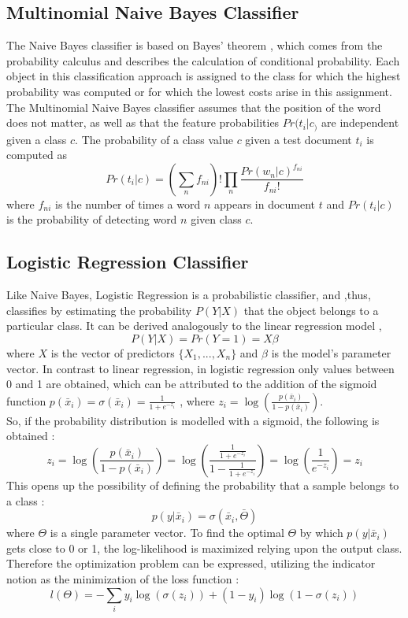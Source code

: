 \documentclass[a4paper, 11pt,titlepage,oneside,openany]{book}
\begin{document}
\subsection{Multinomial Naive Bayes Classifier}
The Naive Bayes classifier is based on  Bayes' theorem \cite{btheory}, which comes from the probability calculus and describes the calculation of conditional probability. Each object in this classification approach is assigned to the class for which the highest probability was computed or for which the lowest costs arise in this assignment.  \\
\noindent The Multinomial Naive Bayes classifier assumes that the position of the word does not matter, as well as  that the feature probabilities $Pr(t_i|c_)$ are independent given a class $c$.
The probability of a class value $c$ given a test document $t_i$ is computed as \cite{multinomialnb}
\[
Pr(t_i|c)=(\sum_{n}f_{ni})!\prod_{n}\frac{Pr(w_n|c)^{f_{ni}}}{f_{ni}!}
\]
where $f_{ni}$ is the number of times a word $n$ appears in document $t$ and $Pr(t_i|c)$ is the probability of detecting word $n$ given class $c$.
\newpage
\subsection{Logistic Regression Classifier}
\noindent Like Naive Bayes, Logistic Regression is a probabilistic classifier, and ,thus, classifies by estimating the probability $P(Y|X)$ that the object belongs to a particular class.
It can be derived analogously to the linear regression model \cite{logisticregressionbook}, 
\[
P(Y|X)=Pr(Y=1)=X\beta
\]
where $X$ is the vector of predictors $\{X_1,...,X_n\}$ and $\beta$ is the model's parameter vector. In contrast to linear regression, in logistic regression only values between 0 and 1 are obtained, which can be attributed to the addition of the sigmoid function $p(\bar{x}_i)=\sigma(\bar{x}_i)=\frac{1}{1+e^{-z_i}}$ \cite{algorithms2}, where $z_i=\log(\frac{p(\bar{x}_i)}{1-p(\bar{x}_i)})$. \\
So, if the probability distribution is modelled with a sigmoid, the following is obtained \cite{algorithms2}:
\[
z_i=\log(\frac{p(\bar{x}_i)}{1-p(\bar{x}_i)})=\log(\frac{\frac{1}{1+e^{-z_i}}}{1-\frac{1}{1+e^{-z_i}}})=\log(\frac{1}{e^{-z_i}})=z_i
\]
This opens up the possibility of defining the probability that a sample belongs to a class \cite{algorithms2}:
\[
p(y|\bar{x}_i)=\sigma(\bar{x}_i,\bar{\Theta})
\]
where $\Theta$ is a single parameter vector.
\noindent To find the optimal $\Theta$ by which $p(y|\bar{x}_i)$ gets close to 0 or 1, the log-likelihood is maximized relying upon the output class. Therefore the optimization problem can be expressed, utilizing the indicator notion as the minimization of the loss function \cite{algorithms}:
\[
l(\Theta)=-\sum_{i}y_i\log(\sigma(z_i))+(1-y_i)\log(1-\sigma(z_i))
\]
\end{document}
